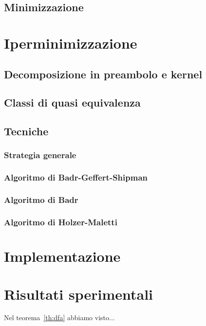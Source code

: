 \documentclass[a4paper,12pt]{report}
\begin{document}
\section{Minimizzazione}

\chapter{Iperminimizzazione}
\label{cap2}

\section{Decomposizione in preambolo e kernel}
\section{Classi di quasi equivalenza}
\section{Tecniche}
\subsection{Strategia generale}
\subsection{Algoritmo di Badr-Geffert-Shipman}
\subsection{Algoritmo di Badr}
\subsection{Algoritmo di Holzer-Maletti}


\newpage

\cite{BGS09}\cite{Badr}
\cite{HM10}
\cite{DFI08}

\chapter{Implementazione}
\chapter{Risultati sperimentali}

Nel teorema~\ref{th:dfa} abbiamo visto...




\end{document}
